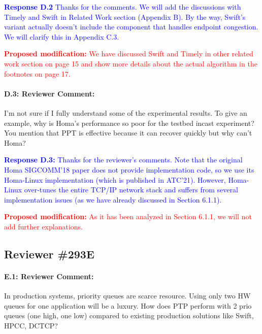 \documentclass[12pt,one-column]{article}
\begin{document}
\noindent\textcolor{blue}{\textbf{Response D.2}
Thanks for the comments. We will add the discussions with Timely and Swift in Related Work section (Appendix B).
By the way, Swift's variant actually doesn't include the component that handles endpoint congestion. We will clarify this in Appendix C.3.
} 

\noindent\textcolor{red}{\textbf{Proposed modification: }
We have discussed Swift and Timely in other related work section on page 15 and show more details about the actual algorithm in the footnotes on page 17.
}

{\it \paragraph{D.3: Reviewer Comment:} I'm not sure if I fully understand some of the experimental results. To give an example, why is Homa's performance so poor for the testbed incast experiment? You mention that PPT is effective because it can recover quickly but why can't Homa?}


\noindent\textcolor{blue}{\textbf{Response D.3:}
Thanks for the reviewer's comments.
Note that the original Homa SIGCOMM'18 paper does not provide implementation code, so we use its Homa-Linux implementation (which is published in ATC'21).
However, Homa-Linux over-tunes the entire TCP/IP network stack and suffers from several implementation issues (as we have already discussed in Section 6.1.1).
}

\noindent\textcolor{red}{\textbf{Proposed modification: }
As it has been analyzed in Section 6.1.1, we will not add further explanations.
}

\subsection{Reviewer \#293E}

{\it \paragraph{E.1: Reviewer Comment:} In production systems, priority queues are scarce resource. Using only two HW queues for one application will be a luxury. How does PTP perform with 2 prio queues (one high, one low) compared to existing production solutions like Swift, HPCC, DCTCP?}
\end{document}
